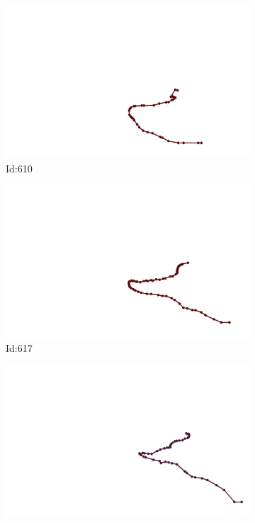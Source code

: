 \documentclass[12pt,twoside]{report}
\begin{document}
\begin{figure}
\begin{subfigure}[b]{0.20\textwidth}
\centering
\includegraphics[width=\textwidth]{../trajectories/610.png}
\caption{Id:610}
\end{subfigure}
\begin{subfigure}[b]{0.20\textwidth}
\centering
\includegraphics[width=\textwidth]{../trajectories/617.png}
\caption{Id:617}
\end{subfigure}
\begin{subfigure}[b]{0.20\textwidth}
\centering
\includegraphics[width=\textwidth]{../trajectories/634.png}

\end{subfigure}
\end{figure}
\end{document}
